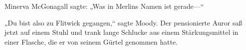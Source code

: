 Minerva McGonagall sagte: „Was in Merlins Namen ist gerade—“

\later

„Du bist also zu Flitwick gegangen,“ sagte Moody. Der pensionierte Auror saß jetzt auf einem Stuhl und trank lange Schlucke aus einem Stärkungsmittel in einer Flasche, die er von seinem Gürtel genommen hatte.

